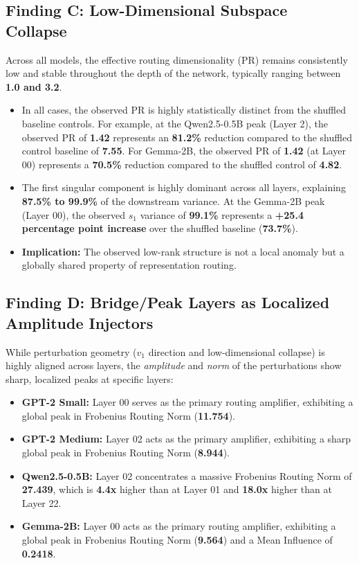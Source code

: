 \documentclass[11pt,a4paper]{article}
\theoremstyle{definition}
\theoremstyle{plain}
\begin{document}
\subsection{Finding C: Low-Dimensional Subspace Collapse}
Across all models, the effective routing dimensionality (PR) remains consistently low and stable throughout the depth of the network, typically ranging between \textbf{1.0 and 3.2}. 
\begin{itemize}[leftmargin=*]
    \item In all cases, the observed PR is highly statistically distinct from the shuffled baseline controls. For example, at the Qwen2.5-0.5B peak (Layer 2), the observed PR of \textbf{1.42} represents an \textbf{81.2\%} reduction compared to the shuffled control baseline of \textbf{7.55}. For Gemma-2B, the observed PR of \textbf{1.42} (at Layer 00) represents a \textbf{70.5\%} reduction compared to the shuffled control of \textbf{4.82}.
    \item The first singular component is highly dominant across all layers, explaining \textbf{87.5\% to 99.9\%} of the downstream variance. At the Gemma-2B peak (Layer 00), the observed $s_1$ variance of \textbf{99.1\%} represents a \textbf{+25.4 percentage point increase} over the shuffled baseline (\textbf{73.7\%}).
    \item \textbf{Implication:} The observed low-rank structure is not a local anomaly but a globally shared property of representation routing.
\end{itemize}

\subsection{Finding D: Bridge/Peak Layers as Localized Amplitude Injectors}
While perturbation geometry ($v_1$ direction and low-dimensional collapse) is highly aligned across layers, the \emph{amplitude} and \emph{norm} of the perturbations show sharp, localized peaks at specific layers:
\begin{itemize}[leftmargin=*]
    \item \textbf{GPT-2 Small:} Layer 00 serves as the primary routing amplifier, exhibiting a global peak in Frobenius Routing Norm (\textbf{11.754}).
    \item \textbf{GPT-2 Medium:} Layer 02 acts as the primary amplifier, exhibiting a sharp global peak in Frobenius Routing Norm (\textbf{8.944}).
    \item \textbf{Qwen2.5-0.5B:} Layer 02 concentrates a massive Frobenius Routing Norm of \textbf{27.439}, which is \textbf{4.4x} higher than at Layer 01 and \textbf{18.0x} higher than at Layer 22.
    \item \textbf{Gemma-2B:} Layer 00 acts as the primary routing amplifier, exhibiting a global peak in Frobenius Routing Norm (\textbf{9.564}) and a Mean Influence of \textbf{0.2418}.
\end{itemize}
\end{document}
